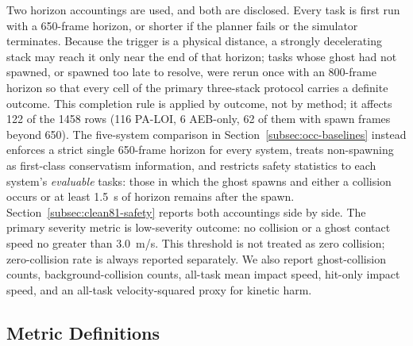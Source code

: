 \documentclass[journal]{IEEEtran}
\begin{document}
Two horizon accountings are used, and both are disclosed. Every task is first run with a 650-frame horizon, or shorter if the planner fails or the simulator terminates. Because the trigger is a physical distance, a strongly decelerating stack may reach it only near the end of that horizon; tasks whose ghost had not spawned, or spawned too late to resolve, were rerun once with an 800-frame horizon so that every cell of the primary three-stack protocol carries a definite outcome. This completion rule is applied by outcome, not by method; it affects 122 of the 1458 rows (116 PA-LOI, 6 AEB-only, 62 of them with spawn frames beyond 650). The five-system comparison in Section~\ref{subsec:occ-baselines} instead enforces a strict single 650-frame horizon for every system, treats non-spawning as first-class conservatism information, and restricts safety statistics to each system's \emph{evaluable} tasks: those in which the ghost spawns and either a collision occurs or at least \SI{1.5}{s} of horizon remains after the spawn. Section~\ref{subsec:clean81-safety} reports both accountings side by side. The primary severity metric is low-severity outcome: no collision or a ghost contact speed no greater than \SI{3.0}{m/s}. This threshold is not treated as zero collision; zero-collision rate is always reported separately. We also report ghost-collision counts, background-collision counts, all-task mean impact speed, hit-only impact speed, and an all-task velocity-squared proxy for kinetic harm.

\subsection{Metric Definitions}
\end{document}
